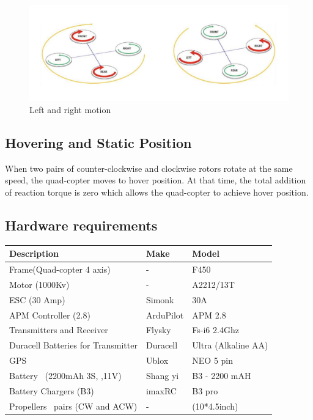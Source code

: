\documentclass[a4paper,twoside]{iiththesis}
\begin{document}
\begin{figure}[h!]
\caption{Left and right motion}
\label{Left and right motion}
\centering
\includegraphics[width=\columnwidth]{./Figures/left_ryt_motion_qc.png}
\end{figure}

\subsection{Hovering and Static Position}
\par When two pairs of counter-clockwise and clockwise rotors rotate at the same speed, the quad-copter moves to hover position. At that time, the total addition of reaction torque is zero which allows the quad-copter to achieve hover position.


\subsection{Hardware requirements}
\begin{table}
\centering
\begin{tabular}{|l|l|l|} 
\hline
\textbf{Description}               & \textbf{Make~} & \textbf{Model}       \\ 
\hline
Frame(Quad-copter 4 axis)          & -              & F450                 \\ 
\hline
Motor (1000Kv)                     & -              & A2212/13T            \\ 
\hline
ESC (30 Amp)                       & Simonk         & 30A                  \\ 
\hline
APM Controller (2.8)               & ArduPilot      & APM 2.8              \\ 
\hline
Transmitters and Receiver~         & Flysky~        & Fs-i6 2.4Ghz         \\ 
\hline
Duracell Batteries for Transmitter & Duracell       & Ultra (Alkaline AA)  \\ 
\hline
GPS                                & Ublox~         & NEO 5 pin            \\ 
\hline
Battery~ (2200mAh 3S, ,11V)        & Shang yi       & B3 - 2200 mAH        \\ 
\hline
Battery Chargers (B3)              & imaxRC         & B3 pro~              \\ 
\hline
Propellers~ pairs (CW and ACW)     & -              & (10*4.5inch)         \\
\hline
\end{tabular}
\end{table}
\end{document}
